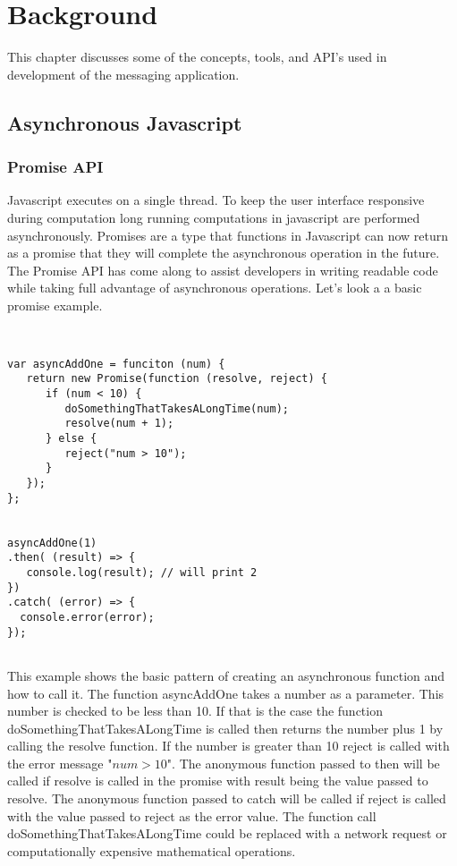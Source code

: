 \chapter{Background}


This chapter discusses some of the concepts, tools, and API’s used in development of the messaging application.


\section{Asynchronous Javascript}


\subsection{Promise API}


Javascript executes on a single thread. To keep the user interface responsive during computation long running computations in javascript are performed asynchronously. Promises are a type that functions in Javascript can now return as a promise that they will complete the asynchronous operation in the future. The Promise API has come along to assist developers in writing readable code while taking full advantage of asynchronous operations. Let’s look a a basic promise example.


\begin{lstlisting}


var asyncAddOne = funciton (num) {
   return new Promise(function (resolve, reject) {
      if (num < 10) {
         doSomethingThatTakesALongTime(num);
         resolve(num + 1);
      } else {
         reject("num > 10");
      }  
   }); 
}; 


asyncAddOne(1)
.then( (result) => {
   console.log(result); // will print 2
})
.catch( (error) => {
  console.error(error);
});


\end{lstlisting}


This example shows the basic pattern of creating an asynchronous function and how to call it. The function asyncAddOne takes a number as a parameter. This number is checked to be less than 10. If that is the case the function doSomethingThatTakesALongTime is called then returns the number plus 1 by calling the resolve function. If the number is greater than 10 reject is called with the error message "$num > 10$". The anonymous function passed to then will be called if resolve is called in the promise with result being the value passed to resolve. The anonymous function passed to catch will be called if reject is called with the value passed to reject as the error value. The function call doSomethingThatTakesALongTime could be replaced with a network request or computationally expensive mathematical operations.



